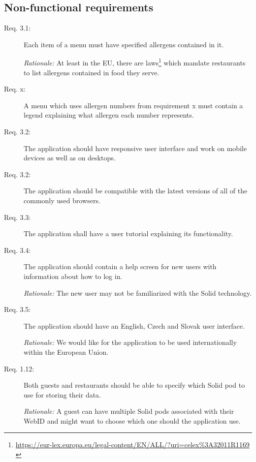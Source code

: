 \subsection{Non-functional requirements}
\begin{description}
    \item [Req. 3.1:] Each item of a menu must have specified allergens contained in it.
    
    \emph{Rationale:} At least in the EU, there are laws\footnote{\url{https://eur-lex.europa.eu/legal-content/EN/ALL/?uri=celex\%3A32011R1169}  \label{fnlabel}} which mandate restaurants to list allergens contained in food they serve.
    \item [Req. x:] A menu which uses allergen numbers from requirement x must contain a legend explaining what allergen each number represents.
    \item [Req. 3.2:] The application should have responsive user interface and work on mobile devices as well as on desktops.
    \item [Req. 3.2:] The application should be compatible with the latest versions of all of the commonly used browsers.
    \item [Req. 3.3:] The application shall have a user tutorial explaining its functionality.
    \item [Req. 3.4:] The application should contain a help screen for new users with information about how to log in.

    \emph{Rationale:} The new user may not be familiarized with the Solid technology.
    \item [Req. 3.5:] The application should have an English, Czech and Slovak user interface.

    \emph{Rationale:} We would like for the application to be used internationally within the European Union.
    \item [Req. 1.12:] Both guests and restaurants should be able to specify which Solid pod to use for storing their data.

    \emph{Rationale:} A guest can have multiple Solid pods associated with their WebID and might want to choose which one should the application use.
\end{description}

\vspace*{\fill}